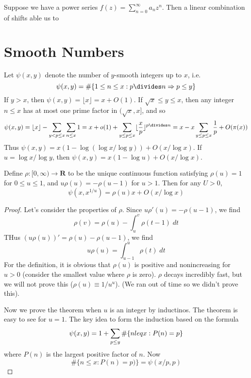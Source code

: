 Suppose we have a power series $f(z) = \sum_{n = 0}^\infty a_n z^n$. Then a linear combination of shifts able us to 

\section{Smooth Numbers}

Let $\psi(x,y)$ denote the number of $y$-smooth integers up to $x$, i.e.
%
\[ \psi(x,y) = \# \{ 1 \leq n \leq x : p \divides n \Rightarrow p \leq y \} \]
%
If $y > x$, then $\psi(x,y) = \lfloor x \rfloor = x + O(1)$. If $\sqrt{x} \leq y \leq x$, then any integer $n \leq x$ has at most one prime factor in $(\sqrt{x}, x]$, and so
%
\[ \psi(x,y) = \lfloor x \rfloor - \sum_{y < p \leq x} \sum_{n \leq x} 1 = x + o(1) + \sum_{y \leq p \leq x} \lfloor \frac{x}{p} \rfloor^{p \divides n} = x - x \sum_{y \leq p \leq x} \frac{1}{p} + O(\pi(x)) \]
%
Thus $\psi(x,y) = x(1 - \log(\log x/ \log y)) + O(x/\log x)$. If $u = \log x/ \log y$, then $\psi(x,y) = x(1 - \log u) + O(x/\log x)$.

\begin{theorem}[Dickman, 1930]
    Define $\rho: [0,\infty) \to \mathbf{R}$ to be the unique continuous function satisfying $\rho(u) = 1$ for $0 \leq u \leq 1$, and $u \rho(u) = - \rho(u-1)$ for $u > 1$. Then for any $U > 0$,
    \[ \psi(x,x^{1/u}) = \rho(u)x + O(x/\log x) \]
\end{theorem}
\begin{proof}
    Let's consider the properties of $\rho$. Since $u \rho'(u) = - \rho(u-1)$, we find
    \[ \rho(v) = \rho(u) - \int_u^v \rho(t-1)\; dt \]
    THus $(u \rho(u))' = \rho(u) - \rho(u-1)$, we find
    \[ u\rho(u) = \int_{u-1}^u \rho(t)\; dt \]
    For the definition, it is obvious that $\rho(u)$ is positive and nonincreasing for $u > 0$ (consider the smallest value where $\rho$ is zero). $\rho$ decays incredibly fast, but we will not prove this ($\rho(u) \equiv 1/u^u$). (We ran out of time so we didn't prove this).

    Now we prove the theorem when $u$ is an integer by inductinos. The theorem is easy to see for $u = 1$. The key idea to form the induction based on the formula
    \[ \psi(x,y) = 1 + \sum_{p \leq y} \# \{ n \\leq x: P(n) = p \} \]
    where $P(n)$ is the largest positive factor of $n$. Now
    \[ \# \{ n \leq x: P(n) = p) \} = \psi(x/p, p) \]
\end{proof}

